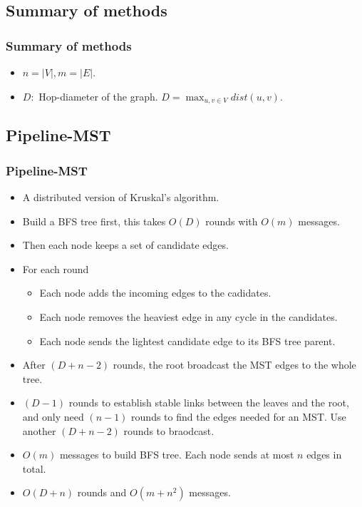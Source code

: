 \subsection{Summary of methods}
\begin{frame}
\frametitle{Summary of methods}

\begin{itemize}
    \item $n=|V|, m=|E|.$
    \item $D:$ Hop-diameter of the graph. $D=\max_{u,v \in V} dist(u, v)$.
\end{itemize}

\end{frame}

\subsection{Pipeline-MST}
\begin{frame}
\frametitle{Pipeline-MST}
\begin{itemize}
    \item A distributed version of Kruskal's algorithm.
    \item Build a BFS tree first, this takes $O(D)$ rounds with $O(m)$ messages.
    \item Then each node keeps a set of candidate edges.
    \item For each round
    \begin{itemize}
        \item Each node adds the incoming edges to the cadidates.
        \item Each node removes the heaviest edge in any cycle in the candidates.
        \item Each node sends the lightest candidate edge to its BFS tree parent.
    \end{itemize}
    \item After $(D+n-2)$ rounds, the root broadcast the MST edges to the whole tree.
    \item $(D-1)$ rounds to establish stable links between the leaves and the root, and only need $(n-1)$ rounds to find the edges needed for an MST. Use another $(D+n-2)$ rounds to braodcast.
    \item $O(m)$ messages to build BFS tree. Each node sends at most $n$ edges in total.
    \item $O(D+n)$ rounds and $O(m + n^2)$ messages.
\end{itemize}
\end{frame}

